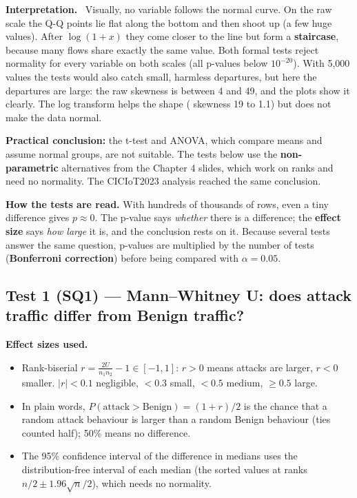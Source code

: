 \documentclass[11pt,a4paper]{article}
\newcommand{\var}[1]{\texttt{\detokenize{#1}}}
\newenvironment{reading}{\par\smallskip\noindent\textbf{\color{navy}Interpretation.}\ }{\par\medskip}
\begin{document}
\begin{reading}
Visually, no variable follows the normal curve. On the raw scale the Q-Q points lie flat along the bottom and then
shoot up (a few huge values). After $\log(1+x)$ they come closer to the line but form a \textbf{staircase}, because
many flows share exactly the same value. Both formal tests reject normality for every variable on both scales (all
p-values below $10^{-20}$). With 5,000 values the tests would also catch small, harmless departures, but here the
departures are large: the raw skewness is between 4 and 49, and the plots show it clearly. The log transform helps the
shape (\var{IN_BYTES} skewness 19 to 1.1) but does not make the data normal.

\textbf{Practical conclusion:} the t-test and ANOVA, which compare means and assume normal groups, are not suitable.
The tests below use the \textbf{non-parametric} alternatives from the Chapter 4 slides, which work on ranks and need
no normality. The CICIoT2023 analysis reached the same conclusion.
\end{reading}

\textbf{How the tests are read.} With hundreds of thousands of rows, even a tiny difference gives $p \approx 0$. The
p-value says \emph{whether} there is a difference; the \textbf{effect size} says \emph{how large} it is, and the
conclusion rests on it. Because several tests answer the same question, p-values are multiplied by the number of tests
(\textbf{Bonferroni correction}) before being compared with $\alpha = 0.05$.

\subsection{Test 1 (SQ1) --- Mann--Whitney U: does attack traffic differ from Benign traffic?}

\textbf{Effect sizes used.}
\begin{itemize}
  \item Rank-biserial $r = \frac{2U}{n_1 n_2} - 1 \in [-1, 1]$: $r > 0$ means attacks are larger, $r < 0$ smaller.
        $|r| < 0.1$ negligible, $< 0.3$ small, $< 0.5$ medium, $\geq 0.5$ large.
  \item In plain words, $P(\text{attack} > \text{Benign}) = (1 + r)/2$ is the chance that a random attack behaviour is
        larger than a random Benign behaviour (ties counted half); 50\% means no difference.
  \item The 95\% confidence interval of the difference in medians uses the distribution-free interval of each median
        (the sorted values at ranks $n/2 \pm 1.96\sqrt{n}/2$), which needs no normality.
\end{itemize}
\end{document}
